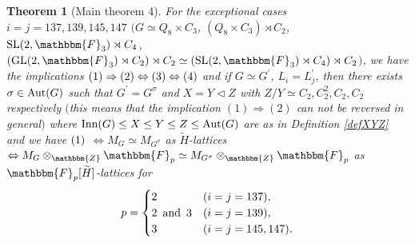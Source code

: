 \documentclass{amsart}
\theoremstyle{plain}
\newtheorem{theorem}{Theorem}[section]
\theoremstyle{definition}
\theoremstyle{remark}
\newcommand{\bZ}{\mathbbm{Z}}\newcommand{\bQ}{\mathbbm{Q}}
\newcommand{\bF}{\mathbbm{F}}\newcommand{\bP}{\mathbbm{P}}
\newcommand{\GL}{{\rm GL}}\newcommand{\SL}{{\rm SL}}
\begin{document}
\begin{theorem}[Main theorem 4]
For the exceptional cases $i=j=137,139,145,147$ 
$($$G\simeq Q_8\times C_3$, $(Q_8\times C_3)\rtimes C_2$, 
$\SL(2,\bF_3)\rtimes C_4$, $(\GL(2,\bF_3)\rtimes C_2)\rtimes C_2\simeq 
(\SL(2,\bF_3)\rtimes C_4)\rtimes C_2$$)$, 
we have the implications 
${\rm (1)}\Rightarrow {\rm (2)}\Leftrightarrow {\rm (3)}
\Leftrightarrow {\rm (4)}$ and if $G\simeq G^\prime$, $L_i=L_j^\prime$, then 
there exists $\sigma\in {\rm Aut}(G)$ such that $G^\prime=G^\sigma$ 
and $X=Y\lhd Z$ with $Z/Y\simeq C_2,C_2^2,C_2,C_2$ respectively 
$($this means that the implication $(1)\Rightarrow (2)$ 
can not be reversed in general$)$
where ${\rm Inn}(G)\leq X\leq Y\leq Z\leq {\rm Aut}(G)$ 
are as in Definition \ref{defXYZ} 
%
and we have 
${\rm (1)}$ 
$\Leftrightarrow M_G\simeq M_{G^\sigma}$ as $\widetilde{H}$-lattices 
$\Leftrightarrow M_G\otimes_\bZ \bF_p\simeq M_{G^\sigma}\otimes_\bZ \bF_p$ 
as $\bF_p[\widetilde{H}]$-lattices for
\begin{align*}
p= 
\begin{cases}
2&(i=j=137),\\
2\ \,{\rm and}\ \,3&(i=j=139),\\
3&(i=j=145,147).
\end{cases}
\end{align*}


\end{theorem}
\end{document}
